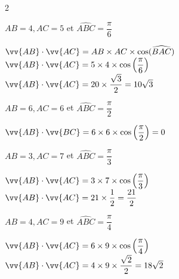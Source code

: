 \documentclass[12pt,a4paper]{article}  %
\begin{document}
\begin{multicols}{2}
	\begin{enumMet}
		\item $A B=4, A C=5$ et $\widehat{A B C}=\dfrac{\pi}{6}$\quad {}\\
		\begin{corrBox}
			$\vv{A B} \cdot \vv{A C}=A B \times A C \times \cos (\widehat{B A C})$\\
			$\vv{A B} \cdot \vv{AC}=5 \times 4 \times \cos \left(\dfrac{\pi}{6}\right)$\\
			$\vv{A B} \cdot \vv{AC}=20 \times \dfrac{\sqrt{3}}{2}=10 \sqrt{3}$
		\end{corrBox}
		\item $A B=6, A C=6$ et $\widehat{A B C}=\dfrac{\pi}{2}$\quad {}\\
		\begin{corrBox}
			$\vv{A B} \cdot \vv{B C}=6 \times 6 \times \cos \left(\dfrac{\pi}{2}\right)=0$
		\end{corrBox}
		\item $A B=3, A C=7$ et $\widehat{A B C}=\dfrac{\pi}{3}$\quad {}\\
		\begin{corrBox}
			$\vv{A B} \cdot \vv{A C}=3 \times 7 \times \cos \left(\dfrac{\pi}{3}\right)$\\
			$\vv{A B} \cdot \vv{A C}=21 \times \dfrac{1}{2}=\dfrac{21}{2}$
		\end{corrBox}
		\item $A B=4, A C=9$ et $\widehat{A B C}=\dfrac{\pi}{4}$\quad {}\\
		\begin{corrBox}
			$\vv{A B} \cdot \vv{A C}=6 \times 9 \times \cos \left(\dfrac{\pi}{4}\right)$\\
			$\vv{A B} \cdot \vv{A C}=4 \times 9 \times \dfrac{\sqrt{2}}{2}=18 \sqrt{2}$
		\end{corrBox}
	\end{enumMet}
\end{multicols}
\end{document}
